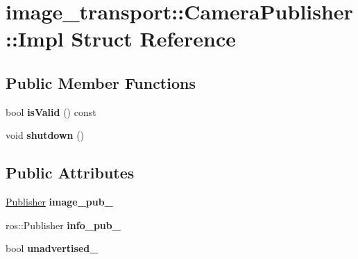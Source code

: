 \hypertarget{structimage__transport_1_1_camera_publisher_1_1_impl}{\section{image\-\_\-transport\-:\-:Camera\-Publisher\-:\-:Impl Struct Reference}
\label{structimage__transport_1_1_camera_publisher_1_1_impl}
}
\subsection*{Public Member Functions}
\begin{DoxyCompactItemize}
\item 
\hypertarget{structimage__transport_1_1_camera_publisher_1_1_impl_a1c6e7e0720ee1cef4daf2b2aa63488dc}{bool {\bfseries is\-Valid} () const }\label{structimage__transport_1_1_camera_publisher_1_1_impl_a1c6e7e0720ee1cef4daf2b2aa63488dc}

\item 
\hypertarget{structimage__transport_1_1_camera_publisher_1_1_impl_a940c609ce4d532d02252b500c8892eec}{void {\bfseries shutdown} ()}\label{structimage__transport_1_1_camera_publisher_1_1_impl_a940c609ce4d532d02252b500c8892eec}

\end{DoxyCompactItemize}
\subsection*{Public Attributes}
\begin{DoxyCompactItemize}
\item 
\hypertarget{structimage__transport_1_1_camera_publisher_1_1_impl_a5e9162e5195d60721d565f9b80bdc750}{\hyperlink{classimage__transport_1_1_publisher}{Publisher} {\bfseries image\-\_\-pub\-\_\-}}\label{structimage__transport_1_1_camera_publisher_1_1_impl_a5e9162e5195d60721d565f9b80bdc750}

\item 
\hypertarget{structimage__transport_1_1_camera_publisher_1_1_impl_ac74b159e34886640a9aa21b2d8fbb475}{ros\-::\-Publisher {\bfseries info\-\_\-pub\-\_\-}}\label{structimage__transport_1_1_camera_publisher_1_1_impl_ac74b159e34886640a9aa21b2d8fbb475}

\item 
\hypertarget{structimage__transport_1_1_camera_publisher_1_1_impl_a823760e90f72ea080febb9bb755623ad}{bool {\bfseries unadvertised\-\_\-}}\label{structimage__transport_1_1_camera_publisher_1_1_impl_a823760e90f72ea080febb9bb755623ad}

\end{DoxyCompactItemize}


